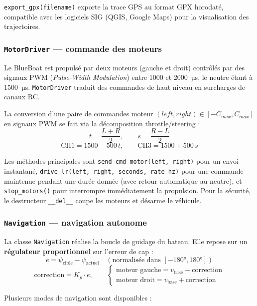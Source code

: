 \texttt{export\_gpx(filename)} exporte la trace GPS au format GPX horodaté, compatible avec les logiciels SIG (QGIS, Google Maps) pour la visualisation des trajectoires.

\subsubsection{\texttt{MotorDriver} — commande des moteurs}

Le BlueBoat est propulsé par deux moteurs (gauche et droit) contrôlés par des signaux PWM (\textit{Pulse-Width Modulation}) entre 1000 et 2000~µs, le neutre étant à 1500~µs. \texttt{MotorDriver} traduit des commandes de haut niveau en surcharges de canaux RC.

La conversion d'une paire de commandes moteur $(left, right) \in [-C_{max}, C_{max}]$ en signaux PWM se fait via la décomposition throttle/steering :
\[
  t = \frac{L + R}{2}, \qquad s = \frac{R - L}{2}
\]
\[
  \text{CH1} = 1500 - 500\,t, \qquad \text{CH3} = 1500 + 500\,s
\]

Les méthodes principales sont \texttt{send\_cmd\_motor(left, right)} pour un envoi instantané, \texttt{drive\_lr(left, right, seconds, rate\_hz)} pour une commande maintenue pendant une durée donnée (avec retour automatique au neutre), et \texttt{stop\_motors()} pour interrompre immédiatement la propulsion. Pour la sécurité, le destructeur \texttt{\_\_del\_\_} coupe les moteurs et désarme le véhicule.

\subsubsection{\texttt{Navigation} — navigation autonome}
\label{sec:bblib:navigation}

La classe \texttt{Navigation} réalise la boucle de guidage du bateau. Elle repose sur un \textbf{régulateur proportionnel} sur l'erreur de cap :
\[
  e = \psi_{\text{cible}} - \psi_{\text{actuel}} \quad (\text{normalisée dans } {[-180°, 180°]})
\]
\[
  \text{correction} = K_p \cdot e, \qquad \begin{cases} \text{moteur gauche} = v_{\text{base}} - \text{correction} \\ \text{moteur droit} = v_{\text{base}} + \text{correction} \end{cases}
\]

Plusieurs modes de navigation sont disponibles :

